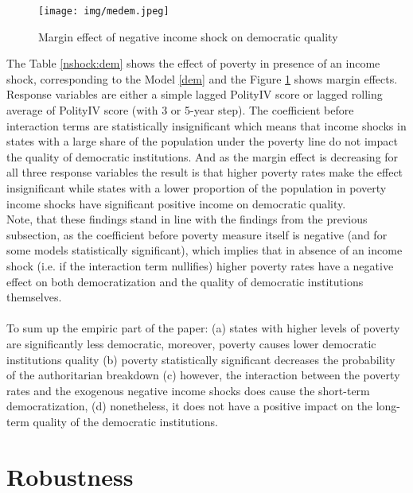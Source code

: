 \documentclass[a4paper, 12pt]{article}
\begin{document}
		\begin{figure}[ht]
	    \centering
	    \texttt{[image: img/medem.jpeg]}
	    \caption{Margin effect of negative income shock on democratic quality}
	    \label{fig:medem}
	\end{figure}
	
	\noindent The Table \ref{nshock:dem} shows the effect of poverty in presence of an income shock, corresponding to the Model \eqref{dem} and the Figure \ref{fig:medem} shows margin effects. Response variables are either a simple lagged PolityIV score or lagged rolling average of PolityIV score (with 3 or 5-year step). The coefficient before interaction terms are statistically insignificant which means that income shocks in states with a large share of the population under the poverty line do not impact the quality of democratic institutions. And as the margin effect is decreasing for all three response variables the result is that higher poverty rates make the effect insignificant while states with a lower proportion of the population in poverty income shocks have significant positive income on democratic quality.
	\\
    
    \noindent Note, that these findings stand in line with the findings from the previous subsection, as the coefficient before poverty measure itself is negative (and for some models statistically significant), which implies that in absence of an income shock (i.e. if the interaction term nullifies) higher poverty rates have a negative effect on both democratization and the quality of democratic institutions themselves.
	\\\\
	\noindent To sum up the empiric part of the paper: (a) states with higher levels of poverty are significantly less democratic, moreover, poverty causes lower democratic institutions quality (b) poverty statistically significant decreases the probability of the authoritarian breakdown (c)  however, the interaction between the poverty rates and the exogenous negative income shocks does cause the short-term democratization, (d) nonetheless, it does not have a positive impact on the long-term quality of the democratic institutions.
	
	\section{Robustness}
    
\end{document}
